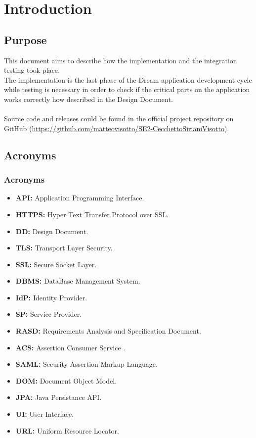 \section{Introduction}
\subsection{Purpose}
This document aims to describe how the implementation and the integration testing took place.\\
The implementation is the last phase of the Dream application development cycle while testing is necessary in order to check if the critical parts on the application works correctly how described in the Design Document.
\\\\
Source code and releases could be found in the official project repository on GitHub (\href{https://github.com/matteovisotto/SE2-CecchettoSirianiVisotto}{https://github.com/matteovisotto/SE2-CecchettoSirianiVisotto}).

\subsection{Acronyms}

\subsubsection{Acronyms}
\begin{itemize}
    \item \textbf{API:} Application Programming Interface.
    \item \textbf{HTTPS:} Hyper Text Transfer Protocol over SSL.
    \item \textbf{DD:} Design Document.
    \item \textbf{TLS:} Transport Layer Security.
    \item \textbf{SSL:} Secure Socket Layer.
    \item \textbf{DBMS:} DataBase Management System.
    \item \textbf{IdP:} Identity Provider.
    \item \textbf{SP:} Service Provider.
    \item \textbf{RASD:} Requirements Analysis and Specification Document.
    \item \textbf{ACS:} Assertion Consumer Service .
    \item \textbf{SAML:} Security Assertion Markup Language.
    \item \textbf{DOM:} Document Object Model.
    \item \textbf{JPA:} Java Persistance API.
    \item \textbf{UI:} User Interface.
    \item \textbf{URL:} Uniform Resource Locator.
\end{itemize}


